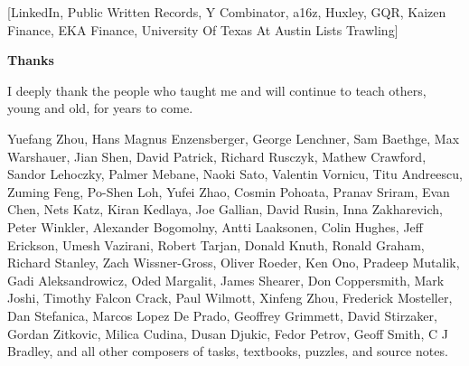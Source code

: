 [LinkedIn, Public Written Records, Y Combinator, a16z, Huxley, GQR, Kaizen Finance, EKA Finance, University Of Texas At Austin Lists Trawling]



\newpage

\textbf{Thanks}

I deeply thank the people who taught me and will continue to teach others, young and old, for years to come.

Yuefang Zhou, Hans Magnus Enzensberger, George Lenchner, Sam Baethge, Max Warshauer, Jian Shen, David Patrick, Richard Rusczyk, Mathew Crawford, Sandor Lehoczky, Palmer Mebane, Naoki Sato, Valentin Vornicu, Titu Andreescu, Zuming Feng, Po-Shen Loh, Yufei Zhao, Cosmin Pohoata, Pranav Sriram, Evan Chen, Nets Katz, Kiran Kedlaya, Joe Gallian, David Rusin, Inna Zakharevich, Peter Winkler, Alexander Bogomolny, Antti Laaksonen, Colin Hughes, Jeff Erickson, Umesh Vazirani, Robert Tarjan, Donald Knuth, Ronald Graham, Richard Stanley, Zach Wissner-Gross, Oliver Roeder, Ken Ono, Pradeep Mutalik, Gadi Aleksandrowicz, Oded Margalit, James Shearer, Don Coppersmith, Mark Joshi, Timothy Falcon Crack, Paul Wilmott, Xinfeng Zhou, Frederick Mosteller, Dan Stefanica, Marcos Lopez De Prado, Geoffrey Grimmett, David Stirzaker, Gordan Zitkovic, Milica Cudina, Dusan Djukic, Fedor Petrov, Geoff Smith, C J Bradley, and all other composers of tasks, textbooks, puzzles, and source notes.